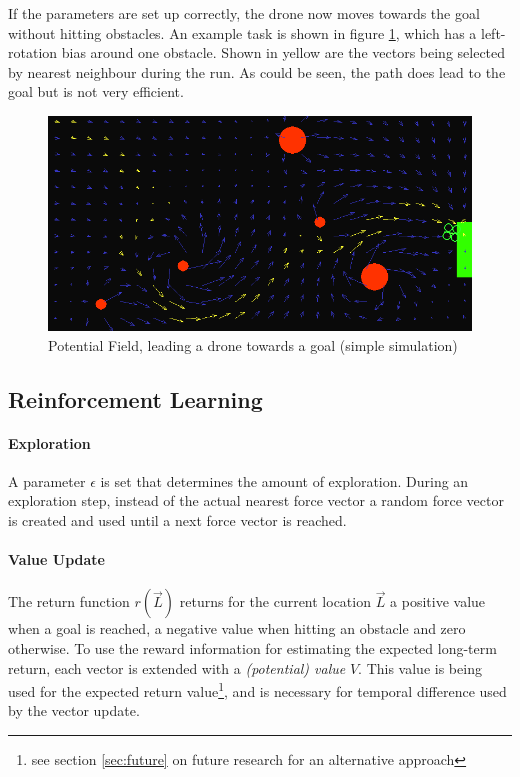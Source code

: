 \documentclass[11pt]{article}
\begin{document}
If the parameters are set up correctly, the drone now moves towards the goal without hitting obstacles. An example task is shown in figure \ref{fig:goal_directed}, which has a left-rotation bias around one obstacle. Shown in yellow are the vectors being selected by nearest neighbour during the run. As could be seen, the path does lead to the goal but is not very efficient.

  \begin{figure}
    \includegraphics[width=1.0\textwidth]{img/goal_directed}
    \caption{Potential Field, leading a drone towards a goal (simple simulation)}
    \label{fig:goal_directed}
  \end{figure}


\subsection{Reinforcement Learning}
\paragraph{Exploration}
A parameter $\epsilon$ is set that determines the amount of exploration. During an exploration step, instead of the actual nearest force vector a random force vector is created and used until a next force vector is reached.

\paragraph{Value Update}
The return function $r(\vec{L})$ returns for the current location $\vec{L}$ a positive value when a goal is reached, a negative value when hitting an obstacle and zero otherwise. To use the reward information for estimating the expected long-term return, each vector is extended with a \emph{(potential) value} $V$. This value is being used for the expected return value\footnote{see section \ref{sec:future} on future research for an alternative approach}, and is necessary for temporal difference used by the vector update.
\end{document}
